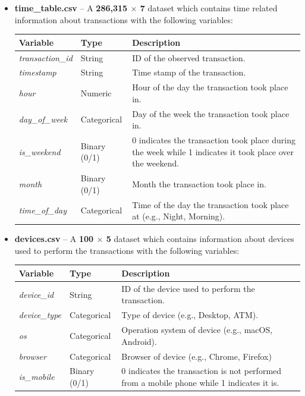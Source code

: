\documentclass[12pt,a4paper]{report}
\begin{document}
\begin{itemize}
    \item \textbf{time\_table.csv} – A \textbf{286,315 $\times$ 7} dataset which contains time related information 
    about transactions with the following variables:

    \begin{center}
    \begin{tabular}{|l|l|p{8cm}|}
        \hline
        \textbf{Variable} & \textbf{Type} & \textbf{Description} \\
        \hline
        \textit{transaction\_id} & String & ID of the observed transaction. \\
        \hline
        \textit{timestamp} & String & Time stamp of the transaction. \\
        \hline
        \textit{hour} & Numeric & Hour of the day the transaction took place in. \\
        \hline
        \textit{day\_of\_week} & Categorical & Day of the week the transaction took place in. \\
        \hline
        \textit{is\_weekend} & Binary (0/1) & 0 indicates the transaction took place during the week while 1 indicates it took place over the weekend. \\
        \hline
        \textit{month} & Binary (0/1) & Month the transaction took place in. \\
        \hline
        \textit{time\_of\_day} & Categorical & Time of the day the transaction took place at (e.g., Night, Morning). \\
        \hline
    \end{tabular}
    \end{center}

    \item \textbf{devices.csv} – A \textbf{100 $\times$ 5} dataset which contains information about devices used to perform the transactions with the following variables:

    \begin{center}
    \begin{tabular}{|l|l|p{8cm}|}
        \hline
        \textbf{Variable} & \textbf{Type} & \textbf{Description} \\
        \hline
        \textit{device\_id} & String & ID of the device used to perform the transaction. \\
        \hline
        \textit{device\_type} & Categorical & Type of device (e.g., Desktop, ATM). \\
        \hline
        \textit{os} & Categorical & Operation system of device (e.g., macOS, Android). \\
        \hline
        \textit{browser} & Categorical & Browser of device (e.g., Chrome, Firefox) \\
        \hline
        \textit{is\_mobile} & Binary (0/1) & 0 indicates the transaction is not performed from a mobile phone while 1 indicates it is. \\
        \hline
    \end{tabular}
    \end{center}
\end{itemize}
    
\end{document}
